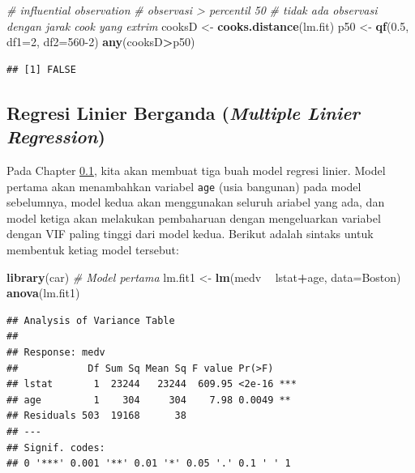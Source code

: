\documentclass[]{book}
\newenvironment{Shaded}{\begin{snugshade}}{\end{snugshade}}
\newcommand{\CommentTok}[1]{\textcolor[rgb]{0.56,0.35,0.01}{\textit{#1}}}
\newcommand{\DataTypeTok}[1]{\textcolor[rgb]{0.13,0.29,0.53}{#1}}
\newcommand{\DecValTok}[1]{\textcolor[rgb]{0.00,0.00,0.81}{#1}}
\newcommand{\FloatTok}[1]{\textcolor[rgb]{0.00,0.00,0.81}{#1}}
\newcommand{\KeywordTok}[1]{\textcolor[rgb]{0.13,0.29,0.53}{\textbf{#1}}}
\newcommand{\NormalTok}[1]{#1}
\newcommand{\OperatorTok}[1]{\textcolor[rgb]{0.81,0.36,0.00}{\textbf{#1}}}
\newcommand{\StringTok}[1]{\textcolor[rgb]{0.31,0.60,0.02}{#1}}
\theoremstyle{definition}
\theoremstyle{definition}
\theoremstyle{definition}
\theoremstyle{remark}
\begin{document}
\begin{Shaded}
\begin{Highlighting}[]
\CommentTok{# influential observation}
\CommentTok{# observasi > percentil 50}
\CommentTok{# tidak ada observasi dengan jarak cook yang extrim}
\NormalTok{cooksD <-}\StringTok{ }\KeywordTok{cooks.distance}\NormalTok{(lm.fit)}
\NormalTok{p50 <-}\StringTok{ }\KeywordTok{qf}\NormalTok{(}\FloatTok{0.5}\NormalTok{, }\DataTypeTok{df1=}\DecValTok{2}\NormalTok{, }\DataTypeTok{df2=}\DecValTok{560-2}\NormalTok{)}
\KeywordTok{any}\NormalTok{(cooksD}\OperatorTok{>}\NormalTok{p50)}
\end{Highlighting}
\end{Shaded}

\begin{verbatim}
## [1] FALSE
\end{verbatim}

\hypertarget{MLR}{%
\subsection{\texorpdfstring{Regresi Linier Berganda (\emph{Multiple Linier Regression})}{Regresi Linier Berganda (Multiple Linier Regression)}}\label{MLR}}

Pada Chapter \ref{MLR}, kita akan membuat tiga buah model regresi linier. Model pertama akan menambahkan variabel \texttt{age} (usia bangunan) pada model sebelumnya, model kedua akan menggunakan seluruh ariabel yang ada, dan model ketiga akan melakukan pembaharuan dengan mengeluarkan variabel dengan VIF paling tinggi dari model kedua. Berikut adalah sintaks untuk membentuk ketiag model tersebut:

\begin{Shaded}
\begin{Highlighting}[]
\KeywordTok{library}\NormalTok{(car)}
\CommentTok{# Model pertama}
\NormalTok{lm.fit1 <-}\StringTok{ }\KeywordTok{lm}\NormalTok{(medv }\OperatorTok{~}\StringTok{ }\NormalTok{lstat}\OperatorTok{+}\NormalTok{age, }\DataTypeTok{data=}\NormalTok{Boston)}
\KeywordTok{anova}\NormalTok{(lm.fit1)}
\end{Highlighting}
\end{Shaded}

\begin{verbatim}
## Analysis of Variance Table
## 
## Response: medv
##            Df Sum Sq Mean Sq F value Pr(>F)    
## lstat       1  23244   23244  609.95 <2e-16 ***
## age         1    304     304    7.98 0.0049 ** 
## Residuals 503  19168      38                   
## ---
## Signif. codes:  
## 0 '***' 0.001 '**' 0.01 '*' 0.05 '.' 0.1 ' ' 1
\end{verbatim}
\end{document}
